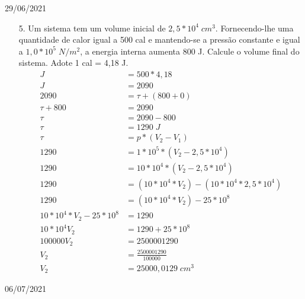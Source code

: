 \documentclass{SchoolBook}
\begin{document}
\begin{day}{29/06/2021}
\begin{enumerate}
            \item[5.] Um sistema tem um volume inicial de $2,5 * 10^4\;cm^3$. Fornecendo-lhe uma quantidade de calor igual a 500 cal e mantendo-se a pressão constante e igual a $1,0 * 10^5\;N/m^2$, a energia interna aumenta 800 J. Calcule o volume final do sistema. Adote 1 cal = 4,18 J.
            \begin{align*}
                                          J &= 500 * 4,18 \\
                                          J &= 2090       \\[3pt]
                                       2090 &= \tau + (800 + 0) \\
                                 \tau + 800 &= 2090             \\
                                       \tau &= 2090 - 800       \\
                                       \tau &= 1290\;J          \\[3pt]
                                       \tau &= p * (V_2 - V_1)                              \\
                                       1290 &= 1 * 10^5 * (V_2 - 2,5 * 10^4)                \\
                                       1290 &= 10 * 10^4 * (V_2 - 2,5 * 10^4)               \\
                                       1290 &= (10 * 10^4 * V_2) - (10 * 10^4 * 2,5 * 10^4) \\
                                       1290 &= (10 * 10^4 * V_2) - 25 * 10^8                \\
                10 * 10^4 * V_2 - 25 * 10^8 &= 1290                                         \\
                              10 * 10^4 V_2 &= 1290 + 25 * 10^8                             \\
                                 100000 V_2 &= 2500001290                                   \\
                                        V_2 &= \frac{2500001290}{100000}                    \\
                                        V_2 &= 25000,0129\;cm^3
            \end{align*}
        \end{enumerate}
    \end{day}
    
    \begin{day}{06/07/2021}
        
    \end{day}
\end{document}
